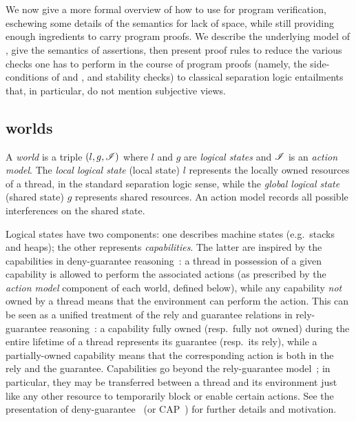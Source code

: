 \section{\colosl}\label{sec:colosl}
We now give a more formal overview of how to use \colosl for program
verification, eschewing some details of the semantics for lack of space,
while still providing enough ingredients to carry program proofs. We
describe the underlying model of \colosl, give the semantics of
\colosl assertions, then present proof rules to reduce the various
checks one has to perform in the course of \colosl program proofs
(namely, the side-conditions of \shiftRule and \extendRule, and
stability checks) to classical separation logic entailments that, in
particular, do not mention subjective views.


\subsection{\colosl worlds}
\label{subsec:model}

A \emph{world} is a triple $(l, g, \mathscr{I})$ where $l$ and $g$ are
\emph{logical states} and $\mathscr{I}$ is an \emph{action model}. The
\emph{local logical state} (local state) $l$ represents the
locally owned resources of a thread, in the standard separation logic
sense, while the \emph{global logical state} (shared state)
$g$ represents shared resources. An action model records all possible interferences on the shared state.

Logical states have two components: one describes machine states
(e.g.\ stacks and heaps); the other represents
\emph{capabilities}. The latter are inspired by the capabilities in
deny-guarantee reasoning~\cite{dg}: a thread in possession of a given
capability is allowed to perform the associated actions (as prescribed
by the \emph{action model} component of each world, defined below),
while any capability \emph{not} owned by a thread means that the
environment can perform the action. This can be seen as a unified
treatment of the rely and guarantee relations in rely-guarantee
reasoning~\cite{rg}: a capability fully owned (resp.\ fully not owned)
during the entire lifetime of a thread represents its guarantee
(resp.\ its rely), while a partially-owned capability means that the
corresponding action is both in the rely and the
guarantee. Capabilities go beyond the rely-guarantee model~\cite{dg};
in particular, they may be transferred between a thread and its
environment just like any other resource to temporarily block or enable certain actions. See the presentation of
deny-guarantee~\cite{dg} (or CAP~\cite{cap-ecoop10}) for further details
and motivation.

